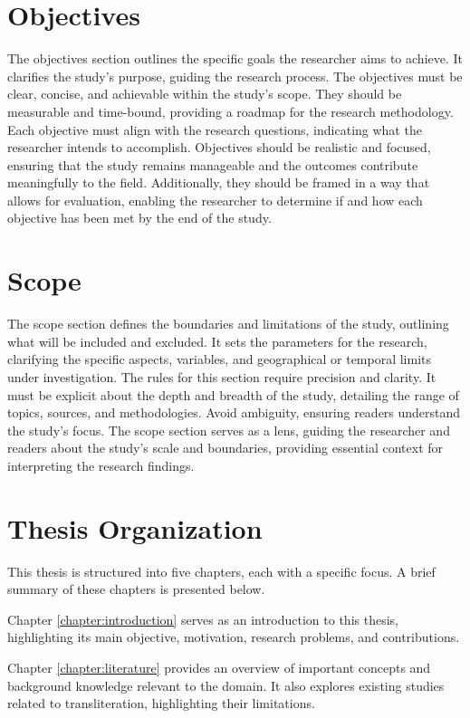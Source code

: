 % 
\section{Objectives}
\label{introduction:objective}
% 
The objectives section outlines the specific goals the researcher aims to achieve. It clarifies the study's purpose, guiding the research process. The objectives must be clear, concise, and achievable within the study's scope. They should be measurable and time-bound, providing a roadmap for the research methodology. Each objective must align with the research questions, indicating what the researcher intends to accomplish. Objectives should be realistic and focused, ensuring that the study remains manageable and the outcomes contribute meaningfully to the field. Additionally, they should be framed in a way that allows for evaluation, enabling the researcher to determine if and how each objective has been met by the end of the study.


% 
\section{Scope}
\label{introduction:scope}
% 
The scope section defines the boundaries and limitations of the study, outlining what will be included and excluded. It sets the parameters for the research, clarifying the specific aspects, variables, and geographical or temporal limits under investigation. The rules for this section require precision and clarity. It must be explicit about the depth and breadth of the study, detailing the range of topics, sources, and methodologies. Avoid ambiguity, ensuring readers understand the study's focus. The scope section serves as a lens, guiding the researcher and readers about the study's scale and boundaries, providing essential context for interpreting the research findings.


% 
\section{Thesis Organization}
\label{introduction:organization}
% 
This thesis is structured into five chapters, each with a specific focus. A brief summary of these chapters is presented below.

\medskip
Chapter \ref{chapter:introduction} serves as an introduction to this thesis, highlighting its main objective, motivation, research problems, and contributions.

\medskip
Chapter \ref{chapter:literature} provides an overview of important concepts and background knowledge relevant to the domain. It also explores existing studies related to transliteration, highlighting their limitations.


